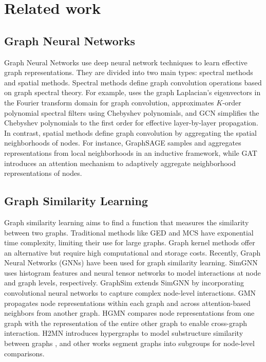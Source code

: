 \section{Related work}
\subsection{Graph Neural Networks}
Graph Neural Networks use deep neural network techniques to learn effective graph representations. They are divided into two main types: spectral methods and spatial methods. Spectral methods define graph convolution operations based on graph spectral theory. For example, \cite{25} uses the graph Laplacian's eigenvectors in the Fourier transform domain for graph convolution, \cite{26} approximates $K$-order polynomial spectral filters using Chebyshev polynomials, and GCN \cite{27} simplifies the Chebyshev polynomials to the first order for effective layer-by-layer propagation. In contrast, spatial methods define graph convolution by aggregating the spatial neighborhoods of nodes. For instance, GraphSAGE \cite{28} samples and aggregates representations from local neighborhoods in an inductive framework, while GAT \cite{29} introduces an attention mechanism to adaptively aggregate neighborhood representations of nodes.

\subsection{Graph Similarity Learning}
Graph similarity learning aims to find a function that measures the similarity between two graphs. Traditional methods like GED \cite{12} and MCS \cite{13} have exponential time complexity, limiting their use for large graphs. Graph kernel methods \cite{30} offer an alternative but require high computational and storage costs. Recently, Graph Neural Networks (GNNs) have been used for graph similarity learning. SimGNN \cite{18} uses histogram features and neural tensor networks \cite{31} to model interactions at node and graph levels, respectively. GraphSim \cite{19} extends SimGNN by incorporating convolutional neural networks to capture complex node-level interactions. GMN \cite{20} propagates node representations within each graph and across attention-based neighbors from another graph. HGMN \cite{21} compares node representations from one graph with the representation of the entire other graph to enable cross-graph interaction. H2MN introduces hypergraphs to model substructure similarity between graphs \cite{22}, and other works \cite{30, 31} segment graphs into subgroups for node-level comparisons.

